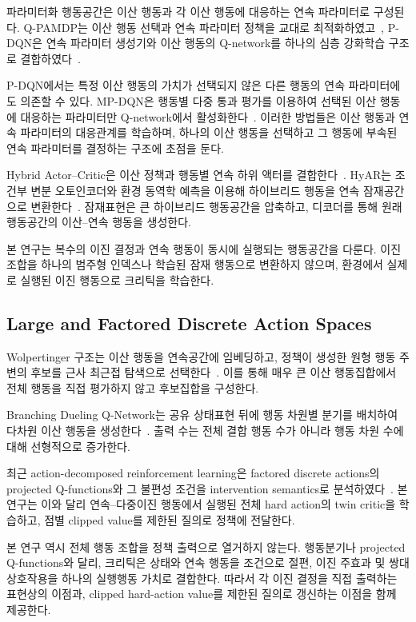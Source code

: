 \documentclass[10pt,journal]{IEEEtran}
\begin{document}
파라미터화 행동공간은 이산 행동과 각 이산 행동에 대응하는 연속 파라미터로 구성된다. Q-PAMDP는 이산 행동 선택과 연속 파라미터 정책을 교대로 최적화하였고~\cite{masson2016}, P-DQN은 연속 파라미터 생성기와 이산 행동의 Q-network를 하나의 심층 강화학습 구조로 결합하였다~\cite{xiong2018}.

P-DQN에서는 특정 이산 행동의 가치가 선택되지 않은 다른 행동의 연속 파라미터에도 의존할 수 있다. MP-DQN은 행동별 다중 통과 평가를 이용하여 선택된 이산 행동에 대응하는 파라미터만 Q-network에서 활성화한다~\cite{bester2019}. 이러한 방법들은 이산 행동과 연속 파라미터의 대응관계를 학습하며, 하나의 이산 행동을 선택하고 그 행동에 부속된 연속 파라미터를 결정하는 구조에 초점을 둔다.

Hybrid Actor--Critic은 이산 정책과 행동별 연속 하위 액터를 결합한다~\cite{fan2019}. HyAR는 조건부 변분 오토인코더와 환경 동역학 예측을 이용해 하이브리드 행동을 연속 잠재공간으로 변환한다~\cite{li2022hyar}. 잠재표현은 큰 하이브리드 행동공간을 압축하고, 디코더를 통해 원래 행동공간의 이산--연속 행동을 생성한다.

본 연구는 복수의 이진 결정과 연속 행동이 동시에 실행되는 행동공간을 다룬다. 이진 조합을 하나의 범주형 인덱스나 학습된 잠재 행동으로 변환하지 않으며, 환경에서 실제로 실행된 이진 행동으로 크리틱을 학습한다.


\subsection{Large and Factored Discrete Action Spaces}

Wolpertinger 구조는 이산 행동을 연속공간에 임베딩하고, 정책이 생성한 원형 행동 주변의 후보를 근사 최근접 탐색으로 선택한다~\cite{dulacarnold2015}. 이를 통해 매우 큰 이산 행동집합에서 전체 행동을 직접 평가하지 않고 후보집합을 구성한다.

Branching Dueling Q-Network는 공유 상태표현 뒤에 행동 차원별 분기를 배치하여 다차원 이산 행동을 생성한다~\cite{tavakoli2018}. 출력 수는 전체 결합 행동 수가 아니라 행동 차원 수에 대해 선형적으로 증가한다.

최근 action-decomposed reinforcement learning은 factored discrete actions의 projected Q-functions와 그 불편성 조건을 intervention semantics로 분석하였다~\cite{lee2025}. 본 연구는 이와 달리 연속--다중이진 행동에서 실행된 전체 hard action의 twin critic을 학습하고, 점별 clipped value를 제한된 질의로 정책에 전달한다.

본 연구 역시 전체 행동 조합을 정책 출력으로 열거하지 않는다. 행동분기나 projected Q-functions와 달리, 크리틱은 상태와 연속 행동을 조건으로 절편, 이진 주효과 및 쌍대 상호작용을 하나의 실행행동 가치로 결합한다. 따라서 각 이진 결정을 직접 출력하는 표현상의 이점과, clipped hard-action value를 제한된 질의로 갱신하는 이점을 함께 제공한다.
\end{document}
